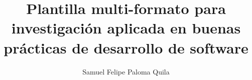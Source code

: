 \documentclass[sigconf,nonacm]{acmart}
\title[Plantilla multi-formato]{Plantilla multi-formato para investigación aplicada en buenas prácticas de desarrollo de software}
\author{Samuel Felipe Paloma Quila}
\affiliation{%
  \institution{SENA}
  \department{Análisis y Desarrollo de Software}
  \city{Ciudad}
  \country{Colombia}}
\begin{document}
\maketitle










\nocite{*}


\end{document}
